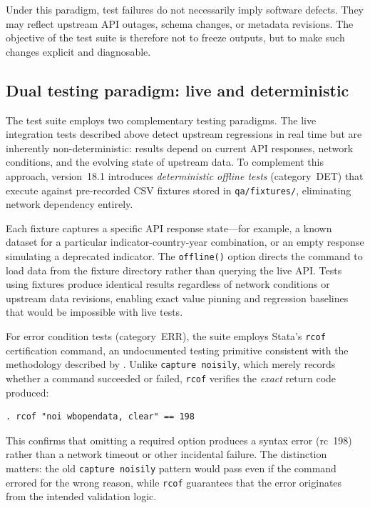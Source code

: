 \documentclass[bib]{statapress}
\begin{document}
Under this paradigm, test failures do not necessarily imply software defects.
They may reflect upstream API outages, schema changes, or metadata revisions.
The objective of the test suite is therefore not to freeze outputs, but to make
such changes explicit and diagnosable.

\subsection{Dual testing paradigm: live and deterministic}

The test suite employs two complementary testing paradigms. The live
integration tests described above detect upstream regressions in real time but
are inherently non-deterministic: results depend on current API responses,
network conditions, and the evolving state of upstream data.  To complement
this approach, version~18.1 introduces \emph{deterministic offline tests}
(category~DET) that execute against pre-recorded CSV fixtures stored in
\texttt{qa/fixtures/}, eliminating network dependency entirely.

Each fixture captures a specific API response state---for example, a known
dataset for a particular indicator-country-year combination, or an empty
response simulating a deprecated indicator.  The \texttt{offline()} option
directs the command to load data from the fixture directory rather than
querying the live API.  Tests using fixtures produce identical results
regardless of network conditions or upstream data revisions, enabling exact
value pinning and regression baselines that would be impossible with live
tests.

For error condition tests (category~ERR), the suite employs Stata's
\texttt{rcof} certification command, an undocumented testing primitive
consistent with the methodology described by
\citet{gould2001certification}.  Unlike \texttt{capture noisily}, which
merely records whether a command succeeded or failed, \texttt{rcof}
verifies the \emph{exact} return code produced:

\begin{stlog}
\begin{verbatim}
. rcof "noi wbopendata, clear" == 198
\end{verbatim}
\nullskip
\end{stlog}

\noindent This confirms that omitting a required option produces a syntax error
(rc~198) rather than a network timeout or other incidental failure.  The
distinction matters: the old \texttt{capture noisily} pattern would pass
even if the command errored for the wrong reason, while \texttt{rcof}
guarantees that the error originates from the intended validation logic.
\end{document}
